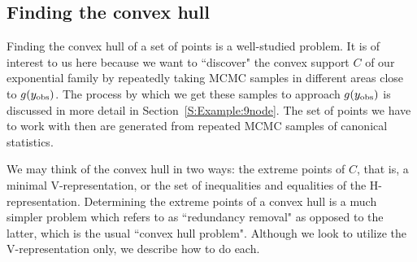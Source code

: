 \subsection{Finding the convex hull}
Finding the convex hull of a set of points is a well-studied problem.  It 
is of interest to us here because we want to ``discover" the convex support $C$
of our exponential family by repeatedly taking MCMC samples in different 
areas close to $g(y_{\text{obs}})$.  The process by which we get these samples 
to approach $g(y_{\text{obs}})$ is discussed in more detail in Section~\ref{S:Example:9node}.  The 
set of points we have to work with then are generated from repeated MCMC
samples of canonical statistics.

We may think of the convex hull in two ways: the extreme points of $C$, that is, 
a minimal V-representation, or the set of inequalities and equalities of the 
H-representation.  Determining the extreme points of a convex hull 
is a much simpler problem which \citet{Fukuda:2004} refers to as ``redundancy 
removal" as opposed to the latter, which is the usual ``convex hull problem".
Although we look to utilize the V-representation only, we describe how to do each.

